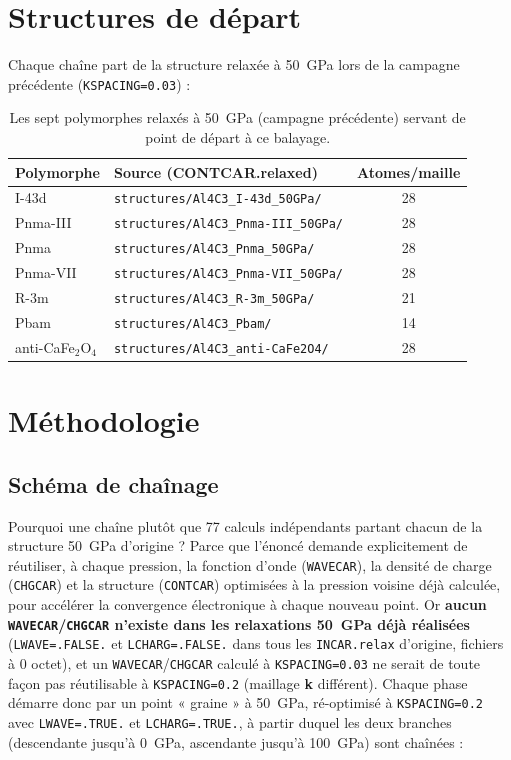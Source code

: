 \documentclass[11pt,a4paper]{article}
\begin{document}
\section{Structures de départ}

Chaque chaîne part de la structure relaxée à 50~GPa lors de la campagne précédente
(\texttt{KSPACING=0.03}) :

\begin{table}[h]
\centering
\begin{tabular}{llc}
\toprule
Polymorphe & Source (CONTCAR.relaxed) & Atomes/maille \\
\midrule
I-43d            & \texttt{structures/Al4C3\_I-43d\_50GPa/}      & 28 \\
Pnma-III         & \texttt{structures/Al4C3\_Pnma-III\_50GPa/}   & 28 \\
Pnma             & \texttt{structures/Al4C3\_Pnma\_50GPa/}       & 28 \\
Pnma-VII         & \texttt{structures/Al4C3\_Pnma-VII\_50GPa/}   & 28 \\
R-3m             & \texttt{structures/Al4C3\_R-3m\_50GPa/}       & 21 \\
Pbam             & \texttt{structures/Al4C3\_Pbam/}              & 14 \\
anti-CaFe$_2$O$_4$ & \texttt{structures/Al4C3\_anti-CaFe2O4/}    & 28 \\
\bottomrule
\end{tabular}
\caption{Les sept polymorphes relaxés à 50~GPa (campagne précédente) servant de point de
départ à ce balayage.}
\end{table}

\section{Méthodologie}

\subsection{Schéma de chaînage}

Pourquoi une chaîne plutôt que 77 calculs indépendants partant chacun de la structure 50~GPa
d'origine ? Parce que l'énoncé demande explicitement de réutiliser, à chaque pression, la
fonction d'onde (\texttt{WAVECAR}), la densité de charge (\texttt{CHGCAR}) et la structure
(\texttt{CONTCAR}) optimisées à la pression voisine déjà calculée, pour accélérer la
convergence électronique à chaque nouveau point. Or \textbf{aucun \texttt{WAVECAR}/\texttt{CHGCAR}
n'existe dans les relaxations 50~GPa déjà réalisées} (\texttt{LWAVE=.FALSE.} et
\texttt{LCHARG=.FALSE.} dans tous les \texttt{INCAR.relax} d'origine, fichiers à 0 octet), et
un \texttt{WAVECAR}/\texttt{CHGCAR} calculé à \texttt{KSPACING=0.03} ne serait de toute façon
pas réutilisable à \texttt{KSPACING=0.2} (maillage \textbf{k} différent). Chaque phase démarre
donc par un point « graine » à 50~GPa, ré-optimisé à \texttt{KSPACING=0.2} avec
\texttt{LWAVE=.TRUE.} et \texttt{LCHARG=.TRUE.}, à partir duquel les deux branches
(descendante jusqu'à 0~GPa, ascendante jusqu'à 100~GPa) sont chaînées :
\end{document}
